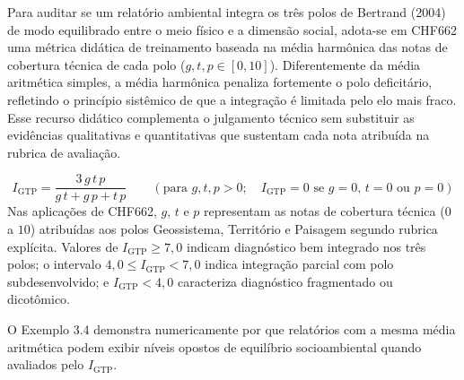 Para auditar se um relatório ambiental integra os três polos de Bertrand (2004) de modo equilibrado entre o meio físico e a dimensão social, adota-se em CHF662 uma métrica didática de treinamento baseada na média harmônica das notas de cobertura técnica de cada polo ($g, t, p \in [0, 10]$). Diferentemente da média aritmética simples, a média harmônica penaliza fortemente o polo deficitário, refletindo o princípio sistêmico de que a integração é limitada pelo elo mais fraco. Esse recurso didático complementa o julgamento técnico sem substituir as evidências qualitativas e quantitativas que sustentam cada nota atribuída na rubrica de avaliação.

\begin{boxFormula}
\[
I_{\text{GTP}} = \frac{3\,g\,t\,p}{g\,t + g\,p + t\,p} \qquad (\text{para } g, t, p > 0; \quad I_{\text{GTP}} = 0 \text{ se } g = 0, \, t = 0 \text{ ou } p = 0)
\]
Nas aplicações de CHF662, $g$, $t$ e $p$ representam as notas de cobertura técnica ($0$ a $10$) atribuídas aos polos Geossistema, Território e Paisagem segundo rubrica explícita. Valores de $I_{\text{GTP}} \ge 7{,}0$ indicam diagnóstico bem integrado nos três polos; o intervalo $4{,}0 \le I_{\text{GTP}} < 7{,}0$ indica integração parcial com polo subdesenvolvido; e $I_{\text{GTP}} < 4{,}0$ caracteriza diagnóstico fragmentado ou dicotômico.
\end{boxFormula}

O Exemplo 3.4 demonstra numericamente por que relatórios com a mesma média aritmética podem exibir níveis opostos de equilíbrio socioambiental quando avaliados pelo $I_{\text{GTP}}$.

